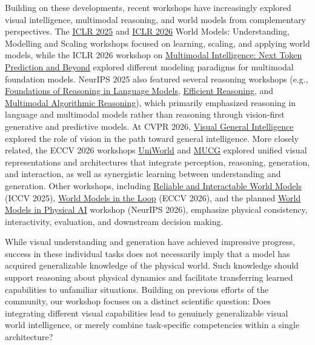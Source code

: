 \documentclass[11pt]{article}
\begin{document}
Building on these developments, recent workshops have increasingly explored visual intelligence, multimodal reasoning, and world models from complementary perspectives. The \href{https://sites.google.com/view/worldmodel-iclr2025/}{ICLR 2025} and \href{https://sites.google.com/view/iclr-2026-workshop-world-model/home}{ICLR 2026} World Models: Understanding, Modelling and Scaling workshops focused on learning, scaling, and applying world models, while the ICLR 2026 workshop on \href{https://mmintelligence.github.io/}{Multimodal Intelligence: Next Token Prediction and Beyond} explored different modeling paradigms for multimodal foundation models. NeurIPS 2025 also featured several reasoning workshops (e.g., \href{https://reasoning-workshop.github.io/}{Foundations of Reasoning in Language Models}, \href{https://efficient-reasoning.github.io/}{Efficient Reasoning}, and \href{https://marworkshop.github.io/neurips25/}{Multimodal Algorithmic Reasoning}), which primarily emphasized reasoning in language and multimodal models rather than reasoning through vision-first generative and predictive models. At CVPR 2026, \href{https://cvpr2026-vgi-workshop.limitlab.xyz/}{Visual General Intelligence} explored the role of vision in the path toward general intelligence. More closely related, the ECCV 2026 workshops \href{https://uniworld-ai.github.io/}{UniWorld} and \href{https://mllm-mucg.github.io/ECCV2026/}{MUCG} explored unified visual representations and architectures that integrate perception, reasoning, generation, and interaction, as well as synergistic learning between understanding and generation. Other workshops, including \href{https://riwm-2025.github.io/RIWM-2025/}{Reliable and Interactable World Models} (ICCV 2025), \href{https://eccv26woop.github.io/}{World Models in the Loop} (ECCV 2026), and the planned \href{https://www.worldmodels-physicalai.com/}{World Models in Physical AI} workshop (NeurIPS 2026), emphasize physical consistency, interactivity, evaluation, and downstream decision making.


While visual understanding and generation have achieved impressive progress, success in these individual tasks does not necessarily imply that a model has acquired generalizable knowledge of the physical world. Such knowledge should support reasoning about physical dynamics and facilitate transferring learned capabilities to unfamiliar situations. Building on previous efforts of the community, our workshop focuses on a distinct scientific question: Does integrating different visual capabilities lead to genuinely generalizable visual world intelligence, or merely combine task-specific competencies within a single architecture?
\end{document}
